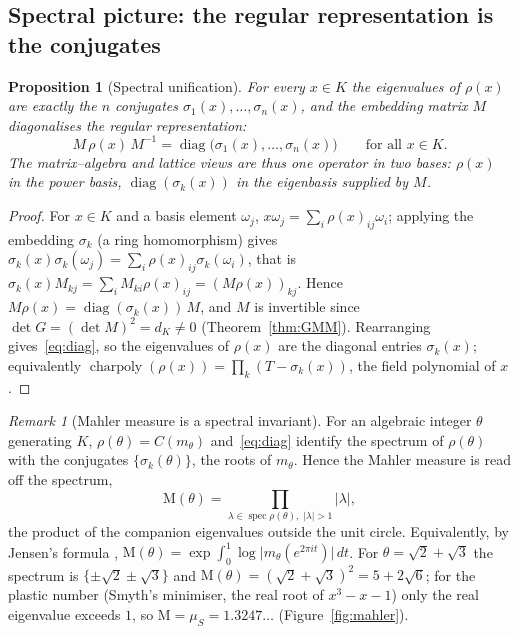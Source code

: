 \documentclass[11pt]{article}
\theoremstyle{plain}
\newtheorem{proposition}[theorem]{Proposition}
\theoremstyle{definition}
\theoremstyle{remark}
\newtheorem{remark}[theorem]{Remark}
\newcommand{\K}{K}
\newcommand{\charpoly}{\operatorname{charpoly}}
\newcommand{\Mah}{\mathrm{M}}
\newcommand{\GG}{G}
\newcommand{\inv}{^{-1}}
\DeclareMathOperator{\diag}{diag}
\begin{document}
\subsection{Spectral picture: the regular representation is the conjugates}\label{subsec:spectral}
\begin{proposition}[Spectral unification]\label{prop:spectral}
For every $x\in\K$ the eigenvalues of $\rho(x)$ are exactly the $n$ conjugates
$\sigma_1(x),\dots,\sigma_n(x)$, and the embedding matrix $M$ diagonalises the regular representation:
\begin{equation}\label{eq:diag}
  M\,\rho(x)\,M\inv=\diag\big(\sigma_1(x),\dots,\sigma_n(x)\big)\qquad\text{for all }x\in\K.
\end{equation}
The matrix--algebra and lattice views are thus one operator in two bases: $\rho(x)$ in the power basis,
$\diag(\sigma_k(x))$ in the eigenbasis supplied by $M$.
\end{proposition}
\begin{proof}
For $x\in\K$ and a basis element $\omega_j$, $x\omega_j=\sum_i\rho(x)_{ij}\omega_i$; applying the embedding
$\sigma_k$ (a ring homomorphism) gives $\sigma_k(x)\sigma_k(\omega_j)=\sum_i\rho(x)_{ij}\sigma_k(\omega_i)$,
that is $\sigma_k(x)M_{kj}=\sum_i M_{ki}\rho(x)_{ij}=(M\rho(x))_{kj}$. Hence $M\rho(x)=\diag(\sigma_k(x))\,M$,
and $M$ is invertible since $\det\GG=(\det M)^2=d_\K\neq0$ (Theorem~\ref{thm:GMM}). Rearranging
gives~\eqref{eq:diag}, so the eigenvalues of $\rho(x)$ are the diagonal entries $\sigma_k(x)$; equivalently
$\charpoly(\rho(x))=\prod_k(T-\sigma_k(x))$, the field polynomial of $x$.
\end{proof}

\begin{remark}[Mahler measure is a spectral invariant]\label{rem:mahlerspectral}
For an algebraic integer $\theta$ generating $\K$, $\rho(\theta)=C(m_\theta)$ and~\eqref{eq:diag} identify
the spectrum of $\rho(\theta)$ with the conjugates $\{\sigma_k(\theta)\}$, the roots of $m_\theta$. Hence the
Mahler measure is read off the spectrum,
\begin{equation}\label{eq:mahlerspectral}
  \Mah(\theta)=\!\!\prod_{\lambda\in\operatorname{spec}\rho(\theta),\;|\lambda|>1}\!\!|\lambda|,
\end{equation}
the product of the companion eigenvalues outside the unit circle. Equivalently, by Jensen's formula
\cite{Mahler}, $\Mah(\theta)=\exp\!\int_0^1\log\bigl|m_\theta(e^{2\pi i t})\bigr|\,dt$. For
$\theta=\sqrt2+\sqrt3$ the spectrum is $\{\pm\sqrt2\pm\sqrt3\}$ and $\Mah(\theta)=(\sqrt2+\sqrt3)^2=5+2\sqrt6$;
for the plastic number (Smyth's minimiser, the real root of $x^3-x-1$) only the real eigenvalue exceeds $1$,
so $\Mah=\mu_S=1.3247\ldots$ (Figure~\ref{fig:mahler}).
\end{remark}
\end{document}
